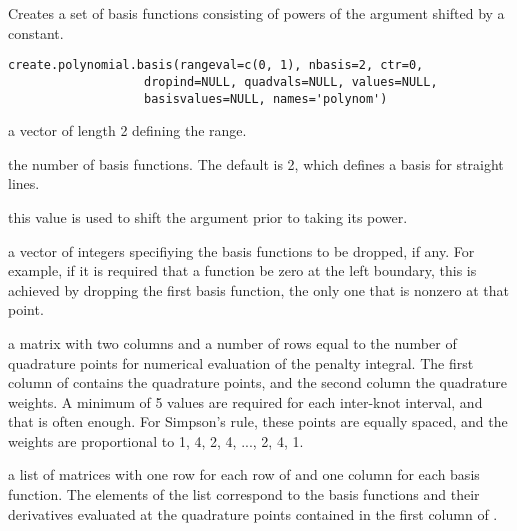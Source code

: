 \begin{Description}\relax
Creates a set of basis functions consisting of powers
of the argument shifted by a constant.
\end{Description}
\begin{Usage}
\begin{verbatim}
create.polynomial.basis(rangeval=c(0, 1), nbasis=2, ctr=0,
                   dropind=NULL, quadvals=NULL, values=NULL,
                   basisvalues=NULL, names='polynom')
\end{verbatim}
\end{Usage}
\begin{Arguments}
\begin{ldescription}
\item[\code{rangeval}] a vector of length 2 defining the range.

\item[\code{nbasis}] the number of basis functions. The default is 2,
which defines a basis for straight lines.

\item[\code{ctr}] this value is used to shift the argument prior to taking
its power.

\item[\code{dropind}] a vector of integers specifiying the basis functions to
be dropped, if any.  For example, if it is required that
a function be zero at the left boundary, this is achieved
by dropping the first basis function, the only one that
is nonzero at that point.

\item[\code{quadvals}] a matrix with two columns and a number of rows equal to the number
of quadrature points for numerical evaluation of the penalty
integral.  The first column of  contains the
quadrature points, and the second column the quadrature weights.  A
minimum of 5 values are required for each inter-knot interval, and
that is often enough.  For Simpson's rule, these points are equally
spaced, and the weights are proportional to 1, 4, 2, 4, ..., 2, 4,
1.

\item[\code{values}] a list of matrices with one row for each row of  and
one column for each basis function.  The elements of the list
correspond to the basis functions and their derivatives evaluated at
the quadrature points contained in the first column of
.


\end{ldescription}
\end{Arguments}
